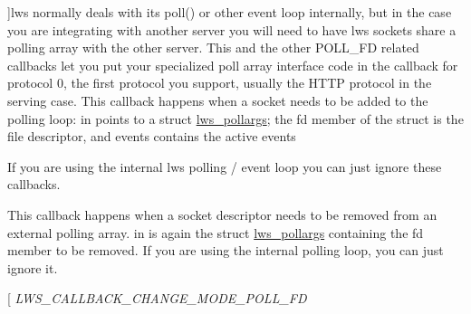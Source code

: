 \begin{Desc}
\begin{description}
{}]lws normally deals with its poll() or other event loop internally, but in the case you are integrating with another server you will need to have lws sockets share a polling array with the other server. This and the other P\+O\+L\+L\+\_\+\+FD related callbacks let you put your specialized poll array interface code in the callback for protocol 0, the first protocol you support, usually the H\+T\+TP protocol in the serving case. This callback happens when a socket needs to be added to the polling loop\+: in points to a struct \hyperlink{structlws__pollargs}{lws\+\_\+pollargs}; the fd member of the struct is the file descriptor, and events contains the active events

If you are using the internal lws polling / event loop you can just ignore these callbacks. \item[{\em 
L\+W\+S\+\_\+\+C\+A\+L\+L\+B\+A\+C\+K\+\_\+\+D\+E\+L\+\_\+\+P\+O\+L\+L\+\_\+\+FD\hypertarget{group__usercb_ggad62860e19975ba4c4af401c3cdb6abf7a1df60f314710236f9b53efbf468da768}{}\label{group__usercb_ggad62860e19975ba4c4af401c3cdb6abf7a1df60f314710236f9b53efbf468da768}
}]This callback happens when a socket descriptor needs to be removed from an external polling array. in is again the struct \hyperlink{structlws__pollargs}{lws\+\_\+pollargs} containing the fd member to be removed. If you are using the internal polling loop, you can just ignore it. \item[{\em 
L\+W\+S\+\_\+\+C\+A\+L\+L\+B\+A\+C\+K\+\_\+\+C\+H\+A\+N\+G\+E\+\_\+\+M\+O\+D\+E\+\_\+\+P\+O\+L\+L\+\_\+\+FD\hypertarget{group__usercb_ggad62860e19975ba4c4af401c3cdb6abf7aa87d2e82fffa42c3680c7403ef94216e}{}\label{group__usercb_ggad62860e19975ba4c4af401c3cdb6abf7aa87d2e82fffa42c3680c7403ef94216e}
}
\end{description}
\end{Desc}
